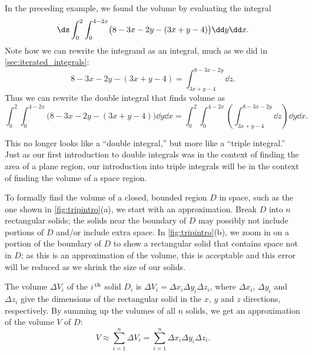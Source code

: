 In the preceding example, we found the volume by evaluating the integral
\[\ds \int_0^2\int_0^{4-2x} \bigl(8-3x-2y-(3x+y-4)\bigr)\dd y\dd x.\]
Note how we can rewrite the integrand as an integral, much as we did in \autoref{sec:iterated_integrals}:
\[8-3x-2y-(3x+y-4) = \int_{3x+y-4}^{8-3x-2y}\dd z.\]
Thus we can rewrite the double integral that finds volume as
\[\int_0^2\int_0^{4-2x} \bigl(8-3x-2y-(3x+y-4)\bigr)\dd y\dd x = \int_0^2\int_0^{4-2x}\left(\int_{3x+y-4}^{8-3x-2y}\dd z\right)\dd y\dd x.\]

This no longer looks like a ``double integral,'' but more like a ``triple integral.'' Just as our first introduction to double integrals was in the context of finding the area of a plane region, our introduction into triple integrals will be in the context of finding the volume of a space region.


To formally find the volume of a closed, bounded region $D$ in space, such as the one shown in \autoref{fig:tripintro}(a), we start with an approximation. Break $D$ into $n$ rectangular solids; the solids near the boundary of $D$ may possibly not include portions of $D$ and/or include extra space. In \autoref{fig:tripintro}(b), we zoom in on a portion of the boundary of $D$ to show a rectangular solid that contains space not in $D$; as this is an approximation of the volume, this is acceptable and this error will be reduced as we shrink the size of our solids.

The volume $\Delta V_i$ of the $i^\text{\,th}$ solid $D_i$ is $\Delta V_i = \Delta x_i\Delta y_i\Delta z_i$, where $\Delta x_i$, $\Delta y_i$ and $\Delta z_i$ give the dimensions of the rectangular solid in the $x$, $y$ and $z$ directions, respectively. By summing up the volumes of all $n$ solids, we get an approximation of the volume $V$ of $D$:
\[V \approx \sum_{i=1}^n \Delta V_i = \sum_{i=1}^n \Delta x_i\Delta y_i\Delta z_i.\]

